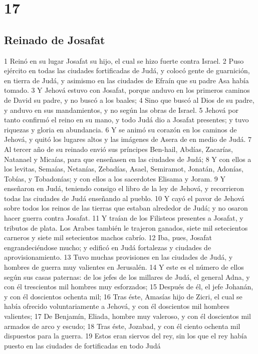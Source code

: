 \chapter{17}

\section*{Reinado de Josafat}


1 Reinó en su lugar Josafat su hijo, el cual se hizo fuerte contra Israel.
2 Puso ejército en todas las ciudades fortificadas de Judá, y colocó gente de guarnición, en tierra de Judá, y asimismo en las ciudades de Efraín que su padre Asa había tomado.
3 Y Jehová estuvo con Josafat, porque anduvo en los primeros caminos de David su padre, y no buscó a los baales;
4 Sino que buscó al Dios de su padre, y anduvo en sus mandamientos, y no según las obras de Israel.
5 Jehová por tanto confirmó el reino en su mano, y todo Judá dio a Josafat presentes; y tuvo riquezas y gloria en abundancia.
6 Y se animó su corazón en los caminos de Jehová, y quitó los lugares altos y las imágenes de Asera de en medio de Judá.
7 Al tercer año de su reinado envió sus príncipes Ben-hail, Abdías, Zacarías, Natanael y Micaías, para que enseñasen en las ciudades de Judá;
8 Y con ellos a los levitas, Semaías, Netanías, Zebadías,  Asael,  Semiramot,  Jonatán,  Adonías, Tobías, y Tobadonías; y con ellos a los sacerdotes Elisama y Joram.
9 Y enseñaron en Judá, teniendo consigo el libro de la ley de Jehová, y recorrieron todas las ciudades de Judá enseñando al pueblo.
10 Y cayó el pavor de Jehová sobre todos los reinos de las tierras que estaban alrededor de Judá; y no osaron hacer guerra contra Josafat.
11 Y traían de los Filisteos presentes a Josafat, y tributos de plata. Los Arabes también le trajeron ganados, siete mil setecientos carneros y siete mil setecientos machos cabrío.
12 Iba, pues, Josafat engrandeciéndose mucho; y edificó en Judá fortalezas y ciudades de aprovisionamiento.
13 Tuvo muchas provisiones en las ciudades de Judá, y hombres de guerra muy valientes en Jerusalén.
14 Y este es el número de ellos según sus casas paternas:  de los jefes de los millares de Judá, el general Adna, y con él trescientos mil hombres muy esforzados;
15  Después de él, el jefe Johanán, y con él doscientos ochenta mil;
16 Tras éste, Amasías hijo de Zicri, el cual se había ofrecido voluntariamente a Jehová, y con él doscientos mil hombres valientes;
17 De Benjamín, Eliada, hombre muy valeroso, y con él doscientos mil armados de arco y escudo;
18 Tras éste, Jozabad, y con él ciento ochenta mil dispuestos para la guerra.
19 Estos eran siervos del rey, sin los que el rey había puesto en las ciudades de fortificadas en todo Judá

